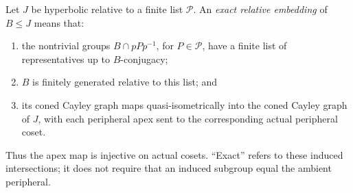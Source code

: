 \begin{definition}\label{transfer:relative-embedding}
Let \(J\) be hyperbolic relative to a finite list \(\mathcal P\). An \emph{exact relative embedding} of \(B\le J\) means that:
\begin{enumerate}[label=(\roman*)]
\item the nontrivial groups \(B\cap pPp^{-1}\), for \(P\in\mathcal P\), have a finite list of representatives up to \(B\)-conjugacy;
\item \(B\) is finitely generated relative to this list; and
\item its coned Cayley graph maps quasi-isometrically into the coned Cayley graph of \(J\), with each peripheral apex sent to the corresponding actual peripheral coset.
\end{enumerate}
Thus the apex map is injective on actual cosets. ``Exact'' refers to these induced intersections; it does not require that an induced subgroup equal the ambient peripheral.
\end{definition}

